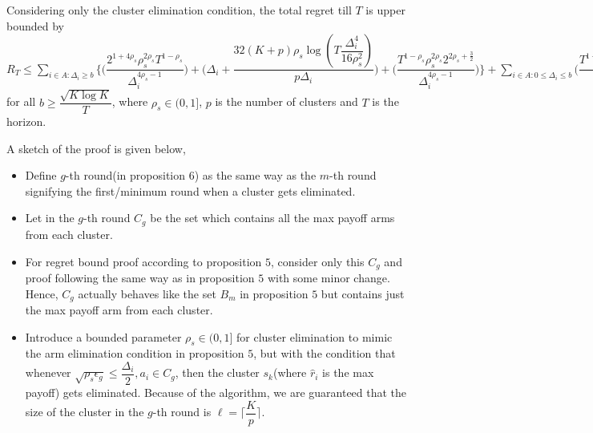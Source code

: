 \begin{proposition}
Considering only the cluster elimination condition, the total regret till $T$ is upper bounded by $R_{T}\leq \sum_{i\in A:\Delta_{i}\geq b}\bigg\lbrace\bigg(\dfrac{2^{1+4\rho_{s}}\rho_{s}^{2\rho_{s}}T^{1-\rho_{s}}}{\Delta_{i}^{4\rho_{s}-1}}\bigg) + \bigg(\Delta_{i}+\dfrac{32(K+p)\rho_{s}\log{(T\dfrac{\Delta_{i}^{4}}{16\rho_{s}^{2}})}}{p\Delta_{i}}\bigg)  +  \bigg(\dfrac{T^{1-\rho_{s}}\rho_{s}^{2\rho_{s}}2^{2\rho_{s}+\frac{3}{2}}}{\Delta_{i}^{4\rho_{s} -1}} \bigg) \bigg \rbrace+\sum_{i\in A:0\leq\Delta_{i}\leq b}\bigg(\dfrac{T^{1-\rho_{s}}\rho_{s}^{2\rho_{s}}2^{2\rho_{s}+\frac{3}{2}}}{b^{4\rho_{s} -1}} \bigg) + max_{i:\Delta\leq b}\Delta_{i}T$ for all $b\geq \dfrac{\sqrt{K\log K}}{T}$, where $\rho_{s}\in (0,1]$, $p$ is the number of clusters and $T$ is the horizon.
\end{proposition}


\begin{remark} A sketch of the proof is given below,
\newline
\begin{itemize}
\item Define $g$-th round(in proposition 6) as the same way as the $m$-th round signifying the first/minimum round when a cluster gets eliminated.
\item Let in the $g$-th round $C_{g}$ be the set which contains all the max payoff arms from each cluster.
\item For regret bound proof according to proposition $5$, consider only this $C_{g}$ and proof following the same way as in proposition $5$ with some minor change. Hence, $C_{g}$ actually behaves like the set $B_{m}$ in proposition $5$ but contains just the max payoff arm from each cluster.
\item Introduce a bounded parameter $\rho_{s}\in (0,1]$ for cluster elimination to mimic the arm elimination condition in proposition $5$, but with the condition that whenever $\sqrt{\rho_{s}\epsilon_{g}}\leq \dfrac{\Delta_{i}}{2}, a_{i}\in C_{g}$, then the cluster $s_{k}$(where $\hat{r}_{i}$ is the max payoff) gets eliminated. Because of the algorithm, we are guaranteed that the size of the cluster in the $g$-th round is $\ell=\bigg\lceil \dfrac{K}{p}\bigg\rceil$.
\end{itemize}
\end{remark}

